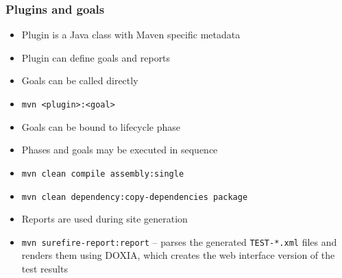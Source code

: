 \documentclass[10pt,xcolor=pdflatex]{beamer}
\begin{document}
\begin{frame}[fragile]\frametitle{Plugins and goals}
\begin{itemize}
    \item Plugin is a Java class with Maven specific metadata
    \item Plugin can define goals and reports
    \item Goals can be called directly
    \item[] \texttt{mvn <plugin>:<goal>}
    \item Goals can be bound to lifecycle phase
    \item Phases and goals may be executed in sequence
    \item[] \texttt{mvn clean compile assembly:single}
    \item[] \texttt{mvn clean dependency:copy-dependencies package}
    \item Reports are used during site generation
    \item[] \texttt{mvn surefire-report:report} -- {\footnotesize parses the generated \verb+TEST-*.xml+ files and renders them using DOXIA, which creates the web interface version of the test results}
\end{itemize}
\end{frame}
\end{document}

